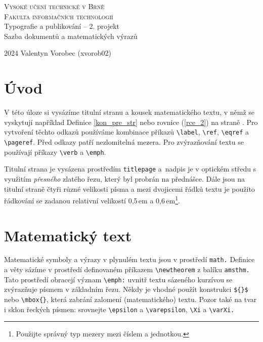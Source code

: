 \documentclass[twocolumn, 11pt, a4paper]{article}
\theoremstyle{definition}
\theoremstyle{plain}
\begin{document}
    \begin{titlepage}
        \begin{center}
            \textsc{\Huge{Vysoké učení technické v Brně}\\[0.5em]
            \huge{Fakulta informačních technologií}}\\
            \LARGE
            Typografie a publikování -- 2. projekt\\[0.5em]
            Sazba dokumentů a matematických výrazů\\
        \end{center}
        {\LARGE 2024 \hfill
        Valentyn Vorobec (xvorob02)}
    \end{titlepage}

    \section*{Úvod}
    V této úloze si vysázíme titulní stranu a kousek matematického textu, v němž se vyskytují například Definice \ref{kon_pre_str} nebo rovnice (\ref{rce_2}) na straně \pageref{rce_2}. Pro vytvoření těchto odkazů používáme kombinace příkazů \verb|\label|, \verb|\ref|, \verb|\eqref| a \verb|\pageref|. Před odkazy patří nezlomitelná mezera. Pro zvýrazňování textu se používají příkazy \verb|\verb| a \verb|\emph|.
    
    Titulní strana je vysázena prostředím \texttt{titlepage} a~nadpis je v optickém středu s využitím \emph{přesného} zlatého řezu, který byl probrán na přednášce. Dále jsou na titulní straně čtyři různé velikosti písma a mezi dvojicemi řádků textu je použito řádkování se zadanou relativní velikostí 0,5\,em a 0,6\,em\footnote{Použijte správný typ mezery mezi číslem a jednotkou.}.
    \section{Matematický text}
    Matematické symboly a výrazy v plynulém textu jsou v prostředí \texttt{math.} Definice a věty sázíme v prostředí definovaném příkazem \verb|\newtheorem| z balíku \texttt{amsthm.} Tato prostředí obracejí význam \verb|\emph:| uvnitř textu sázeného kurzívou se zvýrazňuje písmem v základním řezu. Někdy je vhodné použít konstrukci \verb|${}$| nebo \verb|\mbox{}|, která zabrání zalomení (matematického) textu. Pozor také na tvar i sklon řeckých písmen: srovnejte \verb|\epsilon| a \verb|\varepsilon|, \verb|\Xi| a \verb|\varXi.|
    
\end{document}
